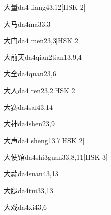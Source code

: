\begin{entry}{大量}{da4 liang4}{3,12}[HSK 2]
\end{entry}

\begin{entry}{大马}{da4ma3}{3,3}
\end{entry}

\begin{entry}{大门}{da4 men2}{3,3}[HSK 2]
\end{entry}

\begin{entry}{大前天}{da4qian2tian1}{3,9,4}
\end{entry}

\begin{entry}{大全}{da4quan2}{3,6}
\end{entry}

\begin{entry}{大人}{da4 ren2}{3,2}[HSK 2]
\end{entry}

\begin{entry}{大赛}{da4sai4}{3,14}
\end{entry}

\begin{entry}{大神}{da4shen2}{3,9}
\end{entry}

\begin{entry}{大声}{da4 sheng1}{3,7}[HSK 2]
\end{entry}

\begin{entry}{大使馆}{da4shi3guan3}{3,8,11}[HSK 3]
\end{entry}

\begin{entry}{大蒜}{da4suan4}{3,13}
\end{entry}

\begin{entry}{大腿}{da4tui3}{3,13}
\end{entry}

\begin{entry}{大戏}{da4xi4}{3,6}
\end{entry}

